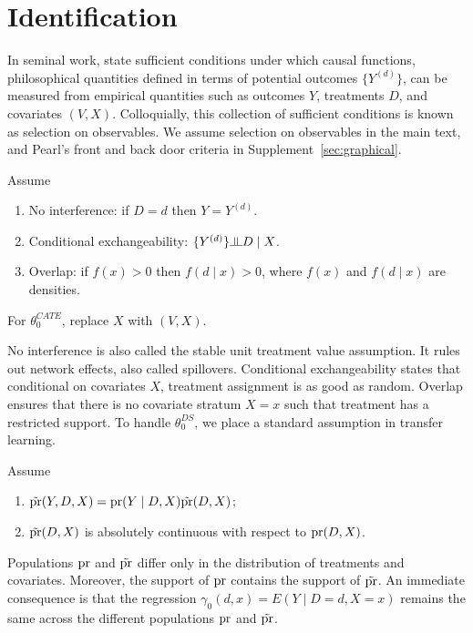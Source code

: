 \section{Identification}\label{sec:id}

In seminal work, \cite{rosenbaum1983central,robins1986new} state sufficient conditions under which causal functions, philosophical quantities defined in terms of potential outcomes $\{Y^{(d)}\}$, can be measured from empirical quantities such as outcomes $Y$, treatments $D$, and covariates $(V,X)$. Colloquially, this collection of sufficient conditions is known as selection on observables. We assume selection on observables in the main text, and Pearl's front and back door criteria in Supplement~\ref{sec:graphical}.

\begin{assumption}\label{assumption:selection}
Assume
\begin{enumerate}
    \item No interference: if $D=d$ then $Y=Y^{(d)}$.
    \item Conditional exchangeability: $\{Y^{(d)}\}\indep D \mid X$.
    \item Overlap: if $f(x)>0$ then $f(d \mid x)>0$, where $f(x)$ and $f(d \mid x)$ are densities. 
\end{enumerate}
For $\theta_0^{CATE}$, replace $X$ with $(V,X)$.
\end{assumption}

No interference is also called the stable unit treatment value assumption. It rules out network effects, also called spillovers. Conditional exchangeability states that conditional on covariates $X$, treatment assignment is as good as random. Overlap ensures that there is no covariate stratum $X=x$ such that treatment has a restricted support.
 To handle $\theta_0^{DS}$, we place a standard assumption in transfer learning.
\begin{assumption}\label{assumption:covariate}
Assume
\begin{enumerate}
    \item $\tilde{\text{\normalfont pr}}(Y,D,X)=\text{\normalfont pr}(Y \mid D,X)\tilde{\text{\normalfont pr}}(D,X)$;
    \item $\tilde{\text{\normalfont pr}}(D,X)$ is absolutely continuous with respect to $\text{\normalfont pr}(D,X)$.
\end{enumerate}
\end{assumption}
Populations $\text{\normalfont pr}$ and $\tilde{\text{\normalfont pr}}$ differ only in the distribution of treatments and covariates. Moreover, the support of $\text{\normalfont pr}$ contains the support of $\tilde{\text{\normalfont pr}}$.  An immediate consequence is that the regression $\gamma_0(d,x)=E(Y \mid D=d,X=x)$ remains the same across the different populations $\text{\normalfont pr}$ and $\tilde{\text{\normalfont pr}}$. 
